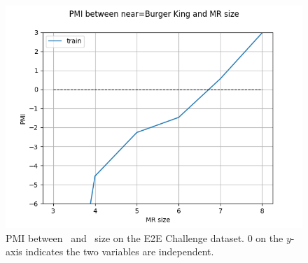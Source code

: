 \begin{figure}[t]
\centering
    \includegraphics[scale=0.5]{ch5/figures/nearbk.png}
\caption{PMI between ~and \meaningrepresentation~size
on the E2E Challenge dataset. 0 on the $y$-axis indicates the two variables are independent.}
\label{fig:bkpmi}
\end{figure}
